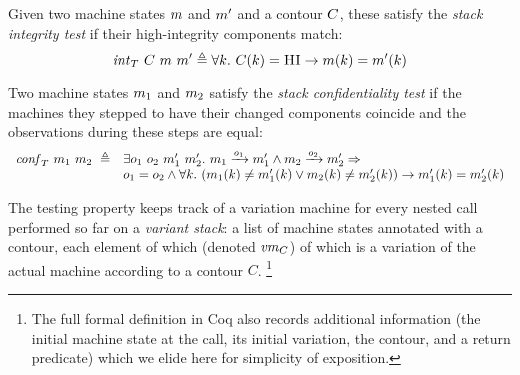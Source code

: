 \documentclass[acmsmall,review,anonymous]{acmart}\settopmatter{printfolios=true,printccs=false,printacmref=false}
\begin{document}
  Given two machine states $m$ and $m'$ and a contour $C$, these
  satisfy the \emph{stack integrity test} if their high-integrity components
  match:
  \[
    \mathit{int}_T ~ C ~ m ~ m' \triangleq
    \forall k . ~
    C(k) = \textsc{HI} \rightarrow
    m(k) = m'(k)
  \]

 Two machine states $m_1$ and $m_2$ satisfy the
\emph{stack confidentiality test} if the machines they stepped to
have their changed components coincide and the observations during
these steps are equal:
\[
\begin{array}{rl}
  \mathit{conf}_T ~ m_1 ~ m_2 ~ \triangleq &
  \exists o_1 ~ o_2 ~ m_1' ~ m_2'. ~
  m_1 \xrightarrow{o_1} m_1' \wedge m_2 \xrightarrow{o_2} m_2' \Rightarrow \\
&    o_1 = o_2 \wedge \forall k . ~
   (     m_1(k) \neq m_1'(k)
    \vee m_2(k) \neq m_2'(k))
    \rightarrow m_1'(k) = m_2'(k)
\end{array}
  \]

 The testing property keeps track of a variation machine
for every nested call performed so far on a {\em variant stack}: a
list of machine states annotated with a contour, each element of which
(denoted $\mathit{vm}_{C}$) of which is a variation of the actual machine
according to a contour $C$.
%
\footnote{The full formal definition in Coq also records additional
  information (the initial machine state at the call, its initial
  variation, the contour, and a return predicate) which we elide
  here for simplicity of exposition.}
\end{document}
